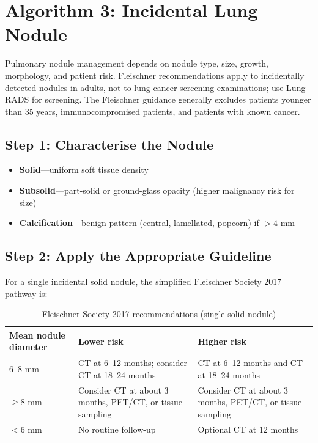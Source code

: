 \clearpage

\section{Algorithm 3: Incidental Lung Nodule}

Pulmonary nodule management depends on nodule type, size, growth, morphology, and patient risk. Fleischner recommendations apply to incidentally detected nodules in adults, not to lung cancer screening examinations; use Lung-RADS for screening. The Fleischner guidance generally excludes patients younger than 35 years, immunocompromised patients, and patients with known cancer.

\subsection{Step 1: Characterise the Nodule}
\begin{itemize}
    \item \textbf{Solid}---uniform soft tissue density
    \item \textbf{Subsolid}---part-solid or ground-glass opacity (higher malignancy risk for size)
    \item \textbf{Calcification}---benign pattern (central, lamellated, popcorn) if $>4$ mm
\end{itemize}

\subsection{Step 2: Apply the Appropriate Guideline}
For a single incidental solid nodule, the simplified Fleischner Society 2017 pathway is:

\begin{table}[h]
\centering
\caption{Fleischner Society 2017 recommendations (single solid nodule)}
\begin{tabular}{|p{}|p{}|p{}|}
\hline
\textbf{Mean nodule diameter} & \textbf{Lower risk} & \textbf{Higher risk} \\
\hline
6--8 mm & CT at 6--12 months; consider CT at 18--24 months & CT at 6--12 months and CT at 18--24 months \\
\hline
$\geq8$ mm & Consider CT at about 3 months, PET/CT, or tissue sampling & Consider CT at about 3 months, PET/CT, or tissue sampling \\
\hline
$<6$ mm & No routine follow-up & Optional CT at 12 months \\
\hline
\end{tabular}
\end{table}

